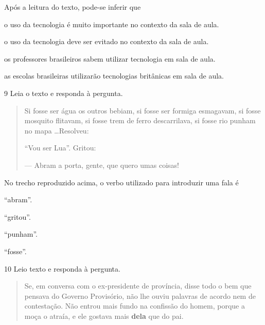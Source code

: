 Após a leitura do texto, pode-se inferir que

\begin{escolha}
  \item o uso da tecnologia é muito importante no contexto da sala de aula.

  \item o uso da tecnologia deve ser evitado no contexto da sala de aula.

  \item os professores brasileiros sabem utilizar tecnologia em sala de aula.

  \item as escolas brasileiras utilizarão tecnologias britânicas em sala de
aula.
\end{escolha}



\num{9} Leia o texto e responda à pergunta.

\begin{quote}
Si fosse ser água os outros bebiam, si fosse ser formiga esmagavam, si
fosse mosquito flitavam, si fosse trem de ferro descarrilava, si fosse
rio punham no mapa \ldots Resolveu:

``Vou ser Lua''. Gritou:

--- Abram a porta, gente, que quero umas coisas!
\end{quote}


No trecho reproduzido acima, o verbo utilizado para introduzir uma fala
é

\begin{escolha}
  \item ``abram''.

  \item ``gritou''.

  \item ``punham''.

  \item ``fosse''.
\end{escolha}

\num{10} Leio texto e responda à pergunta.

\begin{quote}
Se, em conversa com o ex-presidente de província, disse todo o bem que
pensava do Governo Provisório, não lhe ouviu palavras de acordo nem de
contestação. Não entrou mais fundo na confissão do homem, porque a moça
o atraía, e ele gostava mais \textbf{dela} que do pai.
\end{quote}

